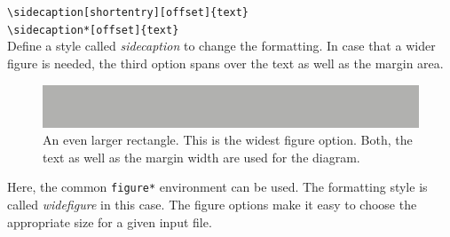 \documentclass{caesar_book}
\begin{document}
\verb+\sidecaption[shortentry][offset]{text}+\\
\verb+\sidecaption*[offset]{text}+\\
Define a style called \textit{sidecaption} to change the formatting. In case that a wider figure is needed, the third option spans over the text as well as the margin area.%
%
\begin{figure}[htbp]
    \includegraphics[width=400pt]{rectangle3}%
    \caption{An even larger rectangle. This is the widest figure option. Both, the text as well as the margin width are used for the diagram.}
    \label{rectangle3}
\end{figure}
%
Here, the common \texttt{figure*} environment can be used. The formatting style is called \textit{widefigure} in this case. 
The figure options make it easy to choose the appropriate size for a given input file. 
\end{document}
